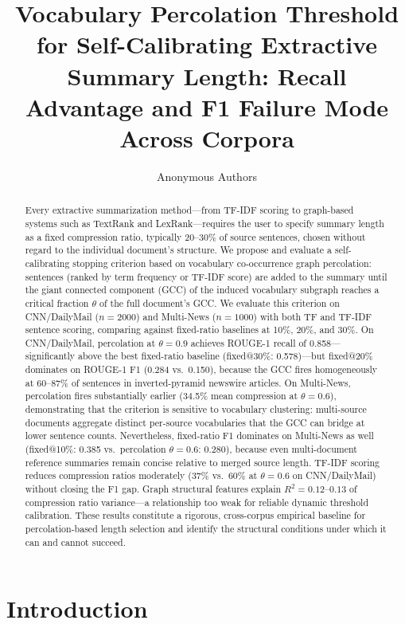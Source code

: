 \documentclass[11pt,letterpaper]{article}
\title{Vocabulary Percolation Threshold for Self-Calibrating Extractive Summary
Length: Recall Advantage and F1 Failure Mode Across Corpora}
\author{
  Anonymous Authors
}
\date{}
\begin{document}
\maketitle

\begin{abstract}
Every extractive summarization method---from TF-IDF scoring to graph-based systems such as
TextRank and LexRank---requires the user to specify summary length as a fixed compression
ratio, typically 20--30\% of source sentences, chosen without regard to the individual
document's structure. We propose and evaluate a self-calibrating stopping criterion based
on vocabulary co-occurrence graph percolation: sentences (ranked by term frequency or
TF-IDF score) are added to the summary until the giant connected component (GCC) of the
induced vocabulary subgraph reaches a critical fraction $\theta$ of the full document's
GCC. We evaluate this criterion on CNN/DailyMail ($n=2000$) and Multi-News ($n=1000$) with
both TF and TF-IDF sentence scoring, comparing against fixed-ratio baselines at 10\%,
20\%, and 30\%. On CNN/DailyMail, percolation at $\theta=0.9$ achieves ROUGE-1 recall of
0.858---significantly above the best fixed-ratio baseline (fixed@30\%: 0.578)---but
fixed@20\% dominates on ROUGE-1 F1 (0.284 vs.\ 0.150), because the GCC fires
homogeneously at 60--87\% of sentences in inverted-pyramid newswire articles. On
Multi-News, percolation fires substantially earlier (34.5\% mean compression at
$\theta=0.6$), demonstrating that the criterion is sensitive to vocabulary clustering:
multi-source documents aggregate distinct per-source vocabularies that the GCC can bridge
at lower sentence counts. Nevertheless, fixed-ratio F1 dominates on Multi-News as well
(fixed@10\%: 0.385 vs.\ percolation $\theta=0.6$: 0.280), because even multi-document
reference summaries remain concise relative to merged source length. TF-IDF scoring
reduces compression ratios moderately (37\% vs.\ 60\% at $\theta=0.6$ on CNN/DailyMail)
without closing the F1 gap. Graph structural features explain $R^2=0.12$--$0.13$ of
compression ratio variance---a relationship too weak for reliable dynamic threshold
calibration. These results constitute a rigorous, cross-corpus empirical baseline for
percolation-based length selection and identify the structural conditions under which it
can and cannot succeed.
\end{abstract}

\section{Introduction}
\end{document}
